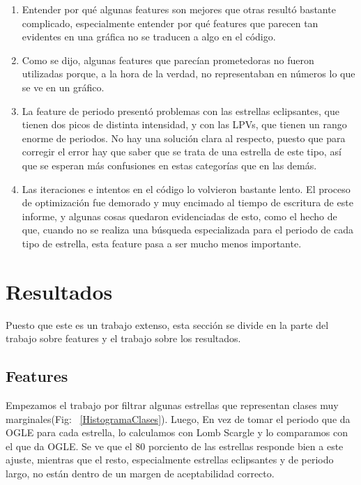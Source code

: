 \documentclass[10pt,twocolumn]{article}
\begin{document}
\begin{enumerate}
    \item Entender por qué algunas features son mejores que otras resultó bastante complicado, especialmente entender por qué features que parecen tan evidentes en una gráfica no se 
    traducen a algo en el código.
    \item Como se dijo, algunas features que parecían prometedoras no fueron utilizadas porque, a la hora de la verdad, no representaban en números lo que se ve en un gráfico. 
    \item La feature de periodo presentó problemas con las estrellas eclipsantes, que tienen dos picos de distinta intensidad, y con las LPVs, que tienen un rango enorme de periodos. 
    No hay una solución clara al respecto, puesto que para corregir el error hay que saber que se trata de una estrella de este tipo, así que se esperan más confusiones
    en estas categorías que en las demás. 
    \item Las iteraciones e intentos en el código lo volvieron bastante lento. El proceso de optimización fue demorado y muy encimado
    al tiempo de escritura de este informe, y algunas cosas quedaron evidenciadas de esto, como el hecho de que, cuando no se 
    realiza una búsqueda especializada para el periodo de cada tipo de estrella, esta feature pasa a ser mucho menos importante. 
\end{enumerate}

\section{Resultados}

Puesto que este es un trabajo extenso, esta sección se divide en la parte del trabajo sobre features y el trabajo sobre los 
resultados.

\subsection{Features}

Empezamos el trabajo por filtrar algunas estrellas que representan clases muy marginales(Fig: ~\ref{HistogramaClases}). Luego,
En vez de tomar el periodo que da OGLE para cada estrella, lo calculamos con Lomb Scargle y lo comparamos con el que da OGLE. 
Se ve que el 80 porciento de las estrellas responde bien a este ajuste, mientras que el resto, especialmente estrellas 
eclipsantes y de periodo largo, no están dentro de un margen de aceptabilidad correcto. 
\end{document}
